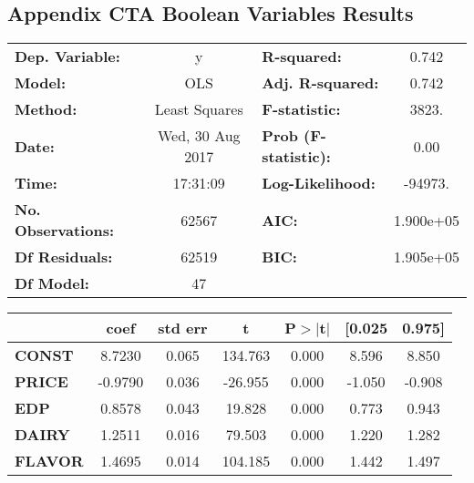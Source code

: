 \documentclass{article}
\begin{document}
\subsection{Appendix CTA Boolean Variables Results}

\begin{center}
\begin{tabular}{lclc}
\toprule
\textbf{Dep. Variable:}    &        y         & \textbf{  R-squared:         } &     0.742   \\
\textbf{Model:}            &       OLS        & \textbf{  Adj. R-squared:    } &     0.742   \\
\textbf{Method:}           &  Least Squares   & \textbf{  F-statistic:       } &     3823.   \\
\textbf{Date:}             & Wed, 30 Aug 2017 & \textbf{  Prob (F-statistic):} &     0.00    \\
\textbf{Time:}             &     17:31:09     & \textbf{  Log-Likelihood:    } &   -94973.   \\
\textbf{No. Observations:} &       62567      & \textbf{  AIC:               } & 1.900e+05   \\
\textbf{Df Residuals:}     &       62519      & \textbf{  BIC:               } & 1.905e+05   \\
\textbf{Df Model:}         &          47      & \textbf{                     } &             \\
\bottomrule
\end{tabular}
\begin{tabular}{lcccccc}
               & \textbf{coef} & \textbf{std err} & \textbf{t} & \textbf{P$>$$|$t$|$} & \textbf{[0.025} & \textbf{0.975]}  \\
\midrule
\textbf{CONST} &       8.7230  &        0.065     &   134.763  &         0.000        &        8.596    &        8.850     \\
\textbf{PRICE}    &      -0.9790  &        0.036     &   -26.955  &         0.000        &       -1.050    &       -0.908     \\
\textbf{EDP}    &       0.8578  &        0.043     &    19.828  &         0.000        &        0.773    &        0.943     \\
\textbf{DAIRY}    &       1.2511  &        0.016     &    79.503  &         0.000        &        1.220    &        1.282     \\
\textbf{FLAVOR}    &       1.4695  &        0.014     &   104.185  &         0.000        &        1.442    &        1.497     \\

\end{tabular}
\end{center}
\end{document}

